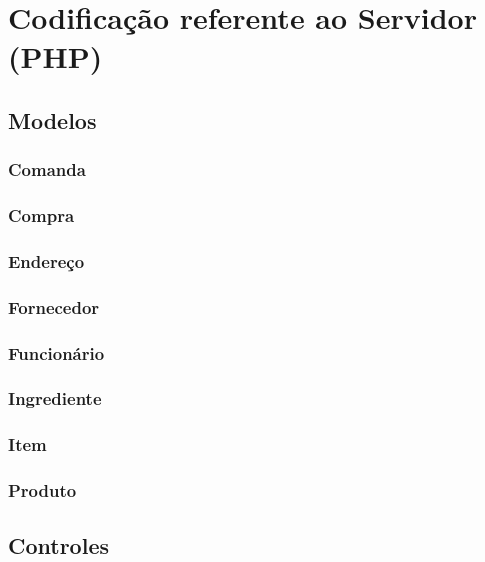 \section{Codificação referente ao Servidor (PHP)}

\lstset{inputpath = ./codes, language = php}
\subsection{Modelos}

\subsubsection{Comanda}

\subsubsection{Compra}

\subsubsection{Endereço}

\subsubsection{Fornecedor}

\subsubsection{Funcionário}

\subsubsection{Ingrediente}

\subsubsection{Item}

\subsubsection{Produto}


\subsection{Controles}

